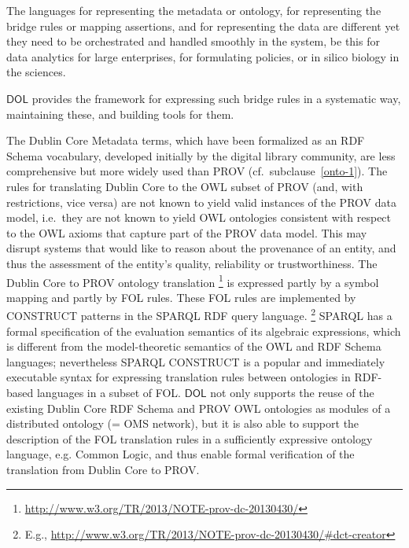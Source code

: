 \documentclass[10pt, a4paper]{isov2}
\newcommand*{\DOL}{\ensuremath{\mathsf{DOL}}\xspace}
\begin{document}
The languages for representing the metadata or ontology, for representing the bridge rules or mapping assertions, and for representing the data are different yet 
they need to be orchestrated and handled smoothly in the system, be this for data analytics for large enterprises, for formulating policies, or in silico biology in the 
sciences. 

\DOL  provides the framework for expressing such bridge rules in a systematic way, maintaining these, and building tools for them. 


The Dublin Core Metadata terms, which have been formalized as an RDF Schema vocabulary, developed initially by the digital library community, are less 
comprehensive but more widely used than PROV (cf.\ subclause~\ref{onto-1}). The rules for translating Dublin Core to the OWL subset of PROV (and, with restrictions, 
vice versa) are not known to yield valid instances of the PROV data model, i.e.\ they are not known to yield OWL ontologies consistent with respect to the OWL axioms that 
capture part of the PROV data model. This may disrupt systems that would like to reason about the provenance of an entity, and thus the assessment of the 
entity's quality, reliability or trustworthiness.
The Dublin Core to PROV ontology translation%
\footnote{\url{http://www.w3.org/TR/2013/NOTE-prov-dc-20130430/}}
  is expressed partly by a symbol mapping and partly by FOL rules. These FOL rules are implemented by CONSTRUCT patterns in the SPARQL RDF query language.%
\footnote{E.g., \url{http://www.w3.org/TR/2013/NOTE-prov-dc-20130430/\#dct-creator}} 
SPARQL has a formal specification of the evaluation semantics of its algebraic expressions, which 
 is different from the model-theoretic semantics of the OWL and RDF Schema languages; nevertheless 
SPARQL CONSTRUCT is a popular and immediately executable syntax for expressing translation rules 
 between ontologies in RDF-based languages in a subset of FOL.
\DOL  not only supports the reuse of the existing Dublin Core RDF Schema and PROV OWL ontologies as 
 modules of a distributed ontology (= OMS network), but it is also able to support the description 
of the FOL translation rules in a sufficiently expressive ontology language, e.g. Common Logic, 
and thus enable formal verification of the translation from Dublin Core to PROV.
\end{document}
